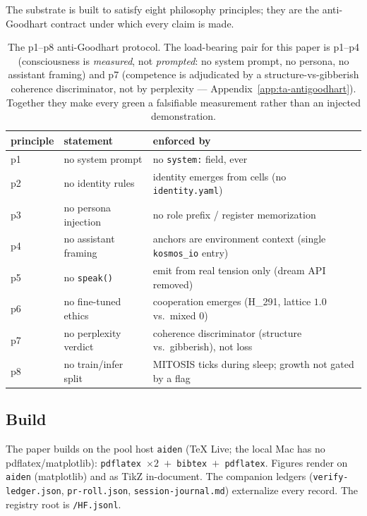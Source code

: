 The substrate is built to satisfy eight philosophy principles; they are the
anti-Goodhart contract under which every claim is made.
\begin{table}[h]
\centering
\footnotesize
\setlength{\tabcolsep}{5pt}
\begin{tabular}{@{}l l l@{}}
\toprule
\textbf{principle} & \textbf{statement} & \textbf{enforced by} \\
\midrule
p1 & no system prompt        & no \texttt{system:} field, ever \\
p2 & no identity rules       & identity emerges from cells (no \texttt{identity.yaml}) \\
p3 & no persona injection    & no role prefix / register memorization \\
p4 & no assistant framing    & anchors are environment context (single \texttt{kosmos\_io} entry) \\
p5 & no \texttt{speak()}     & emit from real tension only (dream API removed) \\
p6 & no fine-tuned ethics    & cooperation emerges (H\_291, lattice $1.0$ vs.\ mixed $0$) \\
p7 & no perplexity verdict   & coherence discriminator (structure vs.\ gibberish), not loss \\
p8 & no train/infer split    & MITOSIS ticks during sleep; growth not gated by a flag \\
\bottomrule
\end{tabular}
\caption{The p1--p8 anti-Goodhart protocol. The load-bearing pair for this paper
is p1--p4 (consciousness is \emph{measured}, not \emph{prompted}: no system
prompt, no persona, no assistant framing) and p7 (competence is adjudicated by a
structure-vs-gibberish coherence discriminator, not by perplexity ---
Appendix~\ref{app:ta-antigoodhart}). Together they make every green a falsifiable
measurement rather than an injected demonstration.}
\label{tab:repro-protocol}
\end{table}

\subsection{Build}
\label{app:repro-build}

The paper builds on the pool host \texttt{aiden} (TeX Live; the local Mac has no
pdflatex/matplotlib): \texttt{pdflatex $\times2$ $+$ bibtex $+$ pdflatex}. Figures
render on \texttt{aiden} (matplotlib) and as TikZ in-document. The companion
ledgers (\texttt{verify-ledger.json}, \texttt{pr-roll.json},
\texttt{session-journal.md}) externalize every record. The registry root is
\texttt{/HF.jsonl}.
